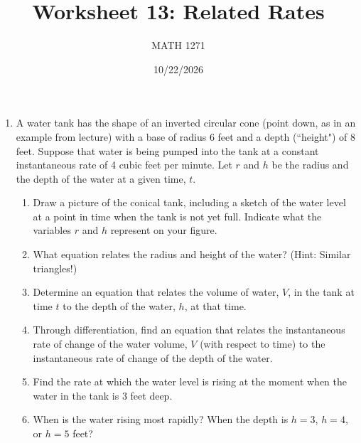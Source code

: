 \documentclass[12pt]{exam}
\title{Worksheet 13: Related Rates}
\author{MATH 1271}
\date{10/22/2026}
\begin{document}
\newpage
\maketitle

\begin{enumerate}

\item A water tank has the shape of an inverted circular cone (point down, as in an example from lecture) with a base of radius 6 feet and a depth (``height") of 8 feet. Suppose that water is being pumped into the tank at a constant instantaneous rate of 4 cubic feet per minute. Let $r$ and $h$ be the radius and the depth of the water at a given time, $t$.

\begin{enumerate}

\item Draw a picture of the conical tank, including a sketch of the water level at a point in time when the tank is not yet full. Indicate what the variables $r$ and $h$ represent on your figure.

\vfill

\item What equation relates the radius and height of the water? (Hint: Similar triangles!)

\vfill

\item Determine an equation that relates the volume of water, $V$, in the tank at time $t$ to the depth of the water, $h$, at that time. 

\vfill

\newpage

\item Through differentiation, find an equation that relates the instantaneous rate of change of the water volume, $V$ (with respect to time) to the instantaneous rate of change of the depth of the water.

\vfill

\item Find the rate at which the water level is rising at the moment when the water in the tank is $3$ feet deep. 

\vfill

\item When is the water rising most rapidly? When the depth is $h=3$, $h=4$, or $h=5$ feet?

\vfill

\end{enumerate}


\end{enumerate}
\end{document}
